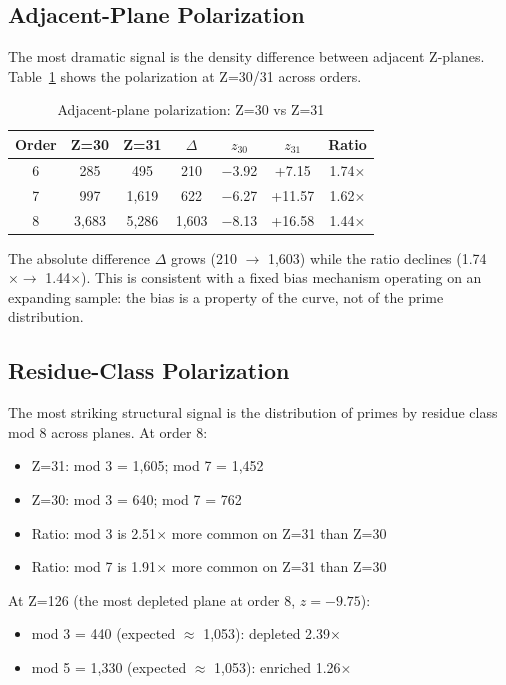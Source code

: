 \documentclass[11pt,a4paper]{article}
\begin{document}
\subsection{Adjacent-Plane Polarization}

The most dramatic signal is the density difference between adjacent
Z-planes. Table~\ref{tab:adjacent} shows the polarization at Z=30/31
across orders.

\begin{table}[h]
\centering
\caption{Adjacent-plane polarization: Z=30 vs Z=31}
\label{tab:adjacent}
\begin{tabular}{ccccccc}
\toprule
Order & Z=30 & Z=31 & $\Delta$ & $z_{30}$ & $z_{31}$ & Ratio \\
\midrule
6 & 285 & 495 & 210 & $-$3.92 & +7.15 & 1.74$\times$ \\
7 & 997 & 1,619 & 622 & $-$6.27 & +11.57 & 1.62$\times$ \\
8 & 3,683 & 5,286 & 1,603 & $-$8.13 & +16.58 & 1.44$\times$ \\
\bottomrule
\end{tabular}
\end{table}

The absolute difference $\Delta$ grows (210 $\to$ 1,603) while the ratio
declines (1.74$\times \to$ 1.44$\times$). This is consistent with a
fixed bias mechanism operating on an expanding sample: the bias is a
property of the curve, not of the prime distribution.

\subsection{Residue-Class Polarization}

The most striking structural signal is the distribution of primes by
residue class mod 8 across planes. At order 8:

\begin{itemize}
\item Z=31: mod 3 = 1,605; mod 7 = 1,452
\item Z=30: mod 3 = 640;  mod 7 = 762
\item Ratio: mod 3 is 2.51$\times$ more common on Z=31 than Z=30
\item Ratio: mod 7 is 1.91$\times$ more common on Z=31 than Z=30
\end{itemize}

At Z=126 (the most depleted plane at order 8, $z=-9.75$):
\begin{itemize}
\item mod 3 = 440 (expected $\approx$ 1,053): depleted 2.39$\times$
\item mod 5 = 1,330 (expected $\approx$ 1,053): enriched 1.26$\times$
\end{itemize}
\end{document}

